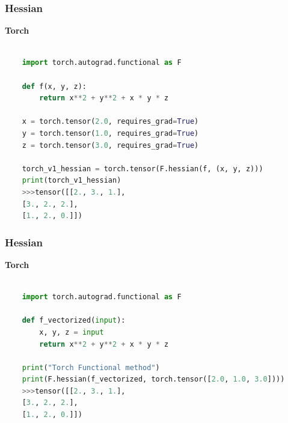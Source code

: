 \documentclass{beamer}
\begin{document}
\begin{frame}[fragile]
    \frametitle{Hessian}

   
        \begin{tcolorbox}
            \textbf{Torch}
          
            \begin{lstlisting}[language=Python, linewidth=\textwidth, xleftmargin=-20pt]
    
    import torch.autograd.functional as F

    def f(x, y, z):
        return x**2 + y**2 + x * y * z

    x = torch.tensor(2.0, requires_grad=True)
    y = torch.tensor(1.0, requires_grad=True)
    z = torch.tensor(3.0, requires_grad=True)

    torch_v1_hessian = torch.tensor(F.hessian(f, (x, y, z)))
    print(torch_v1_hessian)
    >>>tensor([[2., 3., 1.],
    [3., 2., 2.],
    [1., 2., 0.]])
    \end{lstlisting}
        \end{tcolorbox}
\end{frame}

\begin{frame}[fragile]
    \frametitle{Hessian}

   
        \begin{tcolorbox}
            \textbf{Torch}
          
            \begin{lstlisting}[language=Python, linewidth=\textwidth, xleftmargin=-20pt]
    
    import torch.autograd.functional as F

    def f_vectorized(input):
        x, y, z = input
        return x**2 + y**2 + x * y * z

    print("Torch Functional method")
    print(F.hessian(f_vectorized, torch.tensor([2.0, 1.0, 3.0])))
    >>>tensor([[2., 3., 1.],
    [3., 2., 2.],
    [1., 2., 0.]])
    \end{lstlisting}
        \end{tcolorbox}
\end{frame}
\end{document}
